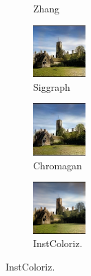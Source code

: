 \begin{figure}[t]
\begin{subfigure}[b]{0.1\textwidth}
		\caption{Zhang}
	\end{subfigure}
	\hfill
	\begin{subfigure}[b]{0.1\textwidth}
		\includegraphics[width=2cm]{si - imgnet2.jpeg}
		\caption{Siggraph}
	\end{subfigure}
	\hfill
	\begin{subfigure}[b]{0.1\textwidth}
		\includegraphics[width=2cm]{chr - imgnet2.jpeg}
		\caption{Chromagan}
	\end{subfigure}
	\hfill
	\begin{subfigure}[b]{0.1\textwidth}
		\includegraphics[width=2cm]{su - imgnet.png}
		\caption{InstColoriz.}
	\end{subfigure}


\end{figure}

